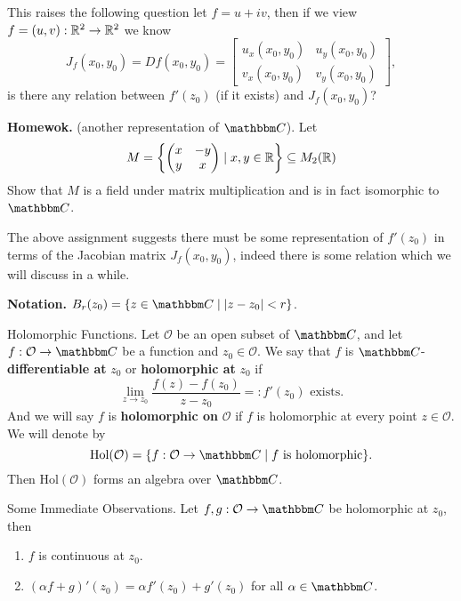 \documentclass[../ComplexAnalysis_Notes.tex]{subfiles}
\begin{document}
This raises the following question let $f = u + i v$, then if we view $f = (u,v) : \mathbb{R}^2 \to \mathbb{R}^2$ we know
\[
    J_f(x_0,y_0) = Df(x_0,y_0) = \begin{bmatrix}
        u_x(x_0,y_0) & u_y(x_0,y_0) \\ v_x(x_0,y_0) & v_y(x_0,y_0)
    \end{bmatrix},    
\] 
is there any relation between $f'(z_0)$ (if it exists) and $J_f(x_0,y_0)$?

\textbf{Homewok.} (another representation of $\C$). Let 
\begin{equation}\label{eq1:lec1}
    M = \left\{ \begin{pmatrix} x & -y \\ y & x \end{pmatrix} \mid x,y \in \mathbb{R}  \right\} \subseteq M_2(\mathbb{R})
\end{equation}
Show that $M$ is a field under matrix multiplication and is in fact isomorphic to $\C$. 

The above assignment suggests there must be some representation of $f'(z_0)$ in terms of the Jacobian matrix $J_f(x_0,y_0)$, indeed there is some relation which we will discuss in a while. 

\textbf{Notation.} $B_r(z_0) = \{ z \in \C \mid |z - z_0| < r \}$. 

\begin{Def}{Holomorphic Functions.}{}
    Let $\mathcal{O}$ be an open subset of $\C$, and let $f : \mathcal{O} \to \C$ be a function and $z_0 \in \mathcal{O}$. We say that $f$ is $\C$-\textbf{differentiable at} $z_0$ or \textbf{holomorphic at} $z_0$ if 
    \[
    \lim_{z \to z_0} \frac{f(z) - f(z_0)}{z - z_0} =: f'(z_0) \mbox{ exists.}    
    \]
    And we will say $f$ is \textbf{holomorphic on} $\mathcal{O}$ if $f$ is holomorphic at every point $z \in \mathcal{O}$. We will denote by 
    \[
        \mathrm{Hol}(\mathcal{O}) = \{ f : \mathcal{O} \to \C \mid f \mbox{ is holomorphic}\}.
    \]
    Then $\mathrm{Hol}(\mathcal{O})$ forms an algebra over $\C$. 
 \end{Def}

\begin{Lem}{Some Immediate Observations.}{}
    Let $f,g : \mathcal{O} \to \C$ be holomorphic at $z_0$, then 
    \begin{enumerate}
        \item $f$ is continuous at $z_0$. 
        \item $(\alpha f + g)'(z_0) = \alpha f'(z_0) + g'(z_0)$ for all $\alpha \in \C$. 
    \end{enumerate}
\end{Lem}
\end{document}
